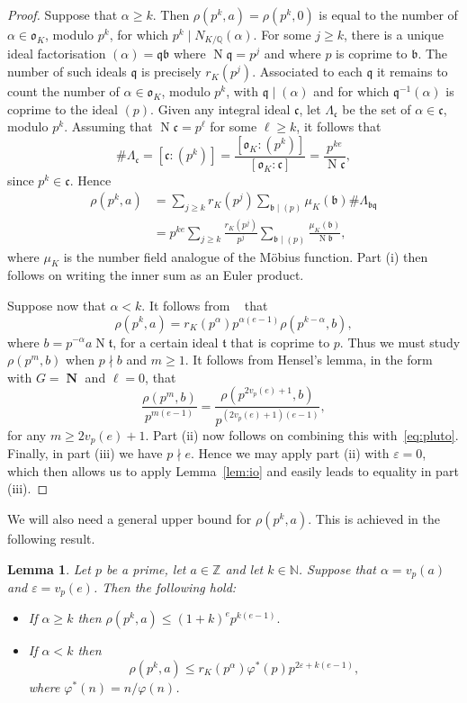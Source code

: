 \documentclass[11pt,letterpaper]{amsart}
\renewcommand{\leq}{\leqslant}
\renewcommand{\geq}{\geqslant}
\newtheorem{lemma}[theorem]{Lemma}
\theoremstyle{definition}
\numberwithin{equation}{section}
\newcommand\ZZ{\mathbb{Z}}
\newcommand\NN{\mathbb{N}}
\newcommand\QQ{\mathbb{Q}}
\newcommand{\ve}{\varepsilon}
\DeclareMathOperator{\n}{N}
\DeclareMathOperator{\nf}{\mathbf{N}}
\newcommand{\fo}{\mathfrak{o}}
\newcommand{\fb}{\mathfrak{b}}
\newcommand{\fc}{\mathfrak{c}}
\newcommand{\fq}{\mathfrak{q}}
\newcommand{\0}{\mathbf{0}}
\begin{document}
\begin{proof}
Suppose that $\alpha\geq k$. 
Then 
 $\rho(p^k,a)=\rho(p^k,0)$ is equal to the number of 
$\alpha\in \fo_K$, modulo $p^k$, for which $p^k\mid N_{K/\QQ}(\alpha)$.
For some $j\geq k$, there is a unique ideal factorisation 
$(\alpha)=\fq\fb$ where $\n\fq=p^j$ and where $p$ is coprime to $\fb$.
The number of such ideals $\fq$ is precisely $r_K(p^j)$.
Associated to each $\fq$ it remains to count the number of $\alpha \in \fo_K$, modulo $p^k$, 
with $\fq\mid (\alpha)$  and for which $\fq^{-1}(\alpha)$ is coprime to the ideal $(p)$.
Given any integral ideal $\fc$, let $\Lambda_{\fc}$ be the set of 
$\alpha \in \fc$, modulo $p^k$.  
Assuming
that  $\n\fc=p^\ell$ for some $\ell\geq k$, it follows that 
$$
\#\Lambda_{\fc}=[\fc: (p^k)]=\frac{[\fo_K: (p^k)]}{[\fo_K:\fc]}=
\frac{p^{ke}}{\n\fc},
$$
since $p^k\in \fc$.  Hence
\begin{align*}
\rho(p^k,a)
&=\sum_{j\geq k} r_K(p^j) 
\sum_{\fb \mid (p)} \mu_K(\fb) \#\Lambda_{\fb\fq} \\
&= p^{ke}\sum_{j\geq k} \frac{r_K(p^j)}{p^j}  
\sum_{\fb \mid (p)} \frac{\mu_K(\fb)}{\n\fb},
\end{align*}
where $\mu_K$ is the number field analogue of the M\"obius function.
Part (i) then follows on writing the inner sum as an Euler product.


Suppose now that $\alpha<k$. 
It follows from ~\cite[Eq.~(4.6)]{nf} 
that 
\begin{equation}\label{eq:pluto}
\rho(p^k,a)=  r_K(p^\alpha)p^{\alpha(e-1)} 
\rho(p^{k-\alpha},b),
\end{equation}
where $b=p^{-\alpha}a\n \mathfrak{t}$, for a certain ideal $\mathfrak{t}$ that is coprime to $p$. 
Thus we must study 
$\rho(p^{m},b)$ when $p\nmid b$ and $m\geq 1$. It follows from Hensel's lemma, in the 
form~\cite[Lemma~3.4]{nf} with 
$G=\nf$ and $\ell=0$, that 
$$
\frac{\rho(p^m,b)}{p^{m(e-1)}}=\frac{\rho(p^{2v_p(e)+1},b)}{p^{(2v_p(e)+1)(e-1)}},
$$
for any $m\geq 2v_p(e)+1$.
Part (ii) now follows on combining this with~\eqref{eq:pluto}. Finally, in  part (iii) we have $p\nmid e$. Hence
we may apply part (ii) with $\ve=0$, which then allows us to apply Lemma~\ref{lem:io} and easily leads to equality in  part (iii).
\end{proof}




We will also need a general upper bound for $\rho(p^k,a)$. This is achieved in the following result. 

\begin{lemma}\label{lem:sun'}
Let $p$ be a prime, 
let $a\in \ZZ$ and let  $k\in \NN$.
 Suppose that $\alpha=v_p(a)$ and $\ve=v_p(e)$. Then the following hold:
 \begin{itemize}
 \item[(i)]
 If $\alpha\geq k$ then  
$
\rho(p^k,a)\leq (1+k)^e p^{k(e-1)}.
$
\item[(ii)]
 If $\alpha< k$ then  
$$
\rho(p^k,a)\leq 
r_K(p^\alpha) \varphi^*(p)
p^{2\ve +k(e-1)},
$$
where $\varphi^*(n)=n/\varphi(n)$.
 \end{itemize}
\end{lemma}
\end{document}
